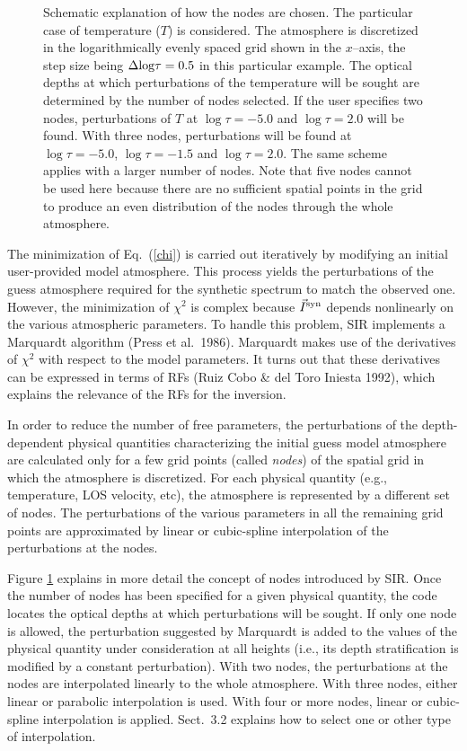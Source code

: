 \begin{figure}[tb]
\begin{center}
\mbox{}
\caption[]{Schematic explanation of how the nodes are chosen. The
particular case of temperature ($T$) is considered. The atmosphere is
discretized in the logarithmically evenly spaced grid shown in the
$x$--axis, the step size being $\Delta {\rm log} \tau = 0.5$ in this
particular example. The optical depths at which perturbations of the
temperature will be sought are determined by the number of nodes
selected.  If the user specifies two nodes, perturbations of $T$ at
$\log \tau = -5.0$ and $\log \tau = 2.0$ will be found. With three
nodes, perturbations will be found at $\log \tau = -5.0$, $\log \tau =
-1.5$ and $\log \tau = 2.0$. The same scheme applies with a larger
number of nodes.  Note that five nodes cannot be used here because
there are no sufficient spatial points in the grid to produce an even
distribution of the nodes through the whole atmosphere.
 \label{nodosfig}}
\end{center}
\end{figure}


The minimization of Eq.\ (\ref{chi}) is carried out iteratively by
modifying an initial user-provided model atmosphere. This process
yields the perturbations of the guess atmosphere required for the
synthetic spectrum to match the observed one. However, the minimization
of $\chi^2$ is complex because $\vec{I}^{\rm syn}$ depends nonlinearly
on the various atmospheric parameters. To handle this problem, SIR
implements a Marquardt algorithm (Press et al.\ 1986).  Marquardt makes
use of the derivatives of $\chi^2$ with respect to the model
parameters. It turns out that these derivatives can be expressed in
terms of RFs (Ruiz Cobo \& del Toro Iniesta 1992), which explains the
relevance of the RFs for the inversion.

In order to reduce the number of free parameters, the perturbations of
the depth-dependent physical quantities characterizing the initial guess 
model atmosphere are calculated only for a few grid points (called {\em nodes}) of the
spatial grid in which the atmosphere is discretized. For each physical
quantity (e.g., temperature, LOS velocity, etc), the atmosphere is
represented by a different set of nodes. The perturbations of the
various parameters in all the remaining grid points are approximated 
by linear or cubic-spline interpolation of the perturbations at the nodes.  


Figure \ref{nodosfig} explains in more detail the concept of nodes
introduced by SIR. Once the number of nodes has been specified for a
given physical quantity, the code locates the optical depths at which
perturbations will be sought. If only one node is allowed, the
perturbation suggested by Marquardt is added to the values of the
physical quantity under consideration at all heights (i.e., its depth
stratification is modified by a constant perturbation). With two nodes, the
perturbations at the nodes are interpolated linearly to the whole
atmosphere.  With three nodes, either linear or parabolic interpolation 
is used. With four or more nodes, linear or cubic-spline interpolation 
is applied. Sect.\ 3.2 explains how to select one or other type of
interpolation.

